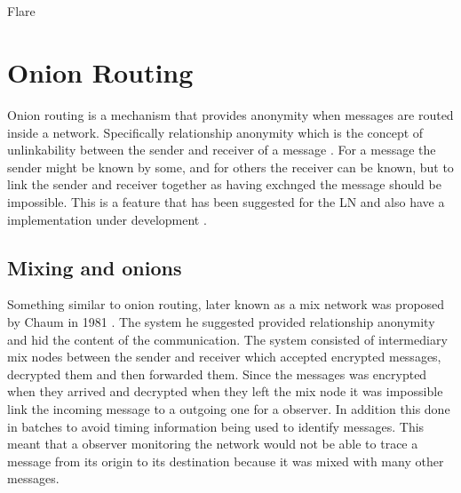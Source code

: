 \documentclass[informationsecurity]{gucmasterproject}
\begin{document}
\paragraph{}
Flare 

\chapter{Onion Routing}

Onion routing is a mechanism that provides anonymity when messages are routed inside a network. 
Specifically relationship anonymity which is the concept of unlinkability between the sender and receiver of a message \cite{pfitzmann2001anonymity}. For a message the sender might be known by some, and for others the receiver can be known, but to link the sender and receiver together as having exchnged the message should be impossible. This is a feature that has been suggested for the LN \cite{LNDM_onion}\cite{SB_onion} and also have a implementation under development \cite{LN_onion_implementation}.

\section{Mixing and onions}

Something similar to onion routing, later known as a mix network was proposed by Chaum in 1981 \cite{chaum1981untraceable}.
The system he suggested provided relationship anonymity and hid the content of the communication. The system consisted of intermediary mix nodes between the sender and receiver which accepted encrypted messages, decrypted them and then forwarded them. Since the messages was encrypted when they arrived and decrypted when they left the mix node it was impossible link the incoming message to a outgoing one for a observer. In addition this done in batches to avoid timing information being used to identify messages. This meant that a observer monitoring the network would not be able to trace a message from its origin to its destination because it was mixed with many other messages.
\end{document}
